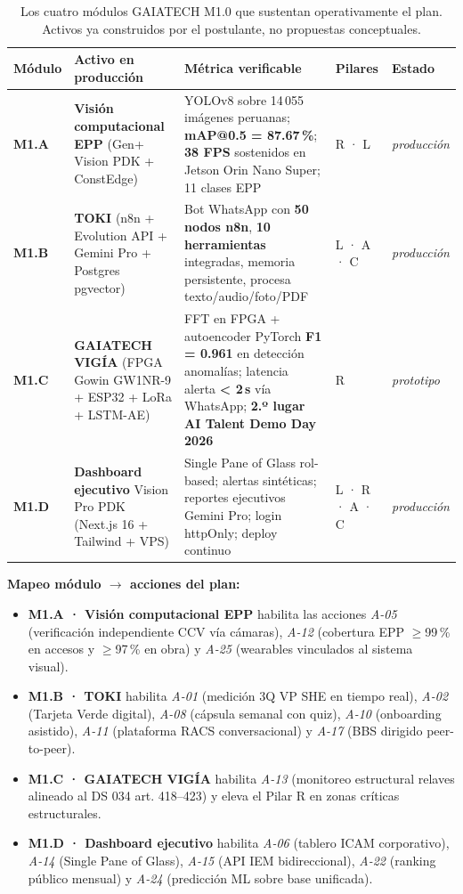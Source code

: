 \documentclass[12pt,a4paper]{article}
\begin{document}
\begin{table}[h]
\centering\footnotesize
\setlength{\tabcolsep}{3.5pt}
\renewcommand{\arraystretch}{1.15}
\begin{tabularx}{\linewidth}{@{}p{0.85cm} >{\raggedright\arraybackslash}p{3.6cm} >{\raggedright\arraybackslash}X p{1.6cm} p{1.8cm}@{}}
\toprule
\textbf{Módulo} & \textbf{Activo en producción} & \textbf{Métrica verificable} & \textbf{Pilares} & \textbf{Estado} \\
\midrule
\textbf{M1.A} & \textbf{Visión computacional EPP} (Gen+ Vision PDK + ConstEdge) & YOLOv8 sobre 14\,055 imágenes peruanas; \textbf{mAP@0.5 = 87.67\,\%}; \textbf{38 FPS} sostenidos en Jetson Orin Nano Super; 11 clases EPP & R · L & \textit{producción} \\
\textbf{M1.B} & \textbf{TOKI} (n8n + Evolution API + Gemini Pro + Postgres pgvector) & Bot WhatsApp con \textbf{50 nodos n8n}, \textbf{10 herramientas} integradas, memoria persistente, procesa texto/audio/foto/PDF & L · A · C & \textit{producción} \\
\textbf{M1.C} & \textbf{GAIATECH VIGÍA} (FPGA Gowin GW1NR-9 + ESP32 + LoRa + LSTM-AE) & FFT en FPGA + autoencoder PyTorch \textbf{F1 = 0.961} en detección anomalías; latencia alerta \textbf{< 2\,s} vía WhatsApp; \textbf{2.º lugar AI Talent Demo Day 2026} & R & \textit{prototipo} \\
\textbf{M1.D} & \textbf{Dashboard ejecutivo} Vision Pro PDK (Next.js 16 + Tailwind + VPS) & Single Pane of Glass rol-based; alertas sintéticas; reportes ejecutivos Gemini Pro; login httpOnly; deploy continuo & L · R · A · C & \textit{producción} \\
\bottomrule
\end{tabularx}
\caption{Los cuatro módulos GAIATECH M1.0 que sustentan operativamente el plan. Activos ya construidos por el postulante, no propuestas conceptuales.}
\label{tab:gaiatech}
\end{table}

\textbf{Mapeo módulo $\to$ acciones del plan:}
\begin{itemize}\setlength\itemsep{1pt}
\item \textbf{M1.A · Visión computacional EPP} habilita las acciones \emph{A-05} (verificación independiente CCV vía cámaras), \emph{A-12} (cobertura EPP $\geq$99\,\% en accesos y $\geq$97\,\% en obra) y \emph{A-25} (wearables vinculados al sistema visual).
\item \textbf{M1.B · TOKI} habilita \emph{A-01} (medición 3Q VP SHE en tiempo real), \emph{A-02} (Tarjeta Verde digital), \emph{A-08} (cápsula semanal con quiz), \emph{A-10} (onboarding asistido), \emph{A-11} (plataforma RACS conversacional) y \emph{A-17} (BBS dirigido peer-to-peer).
\item \textbf{M1.C · GAIATECH VIGÍA} habilita \emph{A-13} (monitoreo estructural relaves alineado al DS 034 art. 418--423) y eleva el Pilar R en zonas críticas estructurales.
\item \textbf{M1.D · Dashboard ejecutivo} habilita \emph{A-06} (tablero ICAM corporativo), \emph{A-14} (Single Pane of Glass), \emph{A-15} (API IEM bidireccional), \emph{A-22} (ranking público mensual) y \emph{A-24} (predicción ML sobre base unificada).
\end{itemize}
\end{document}
